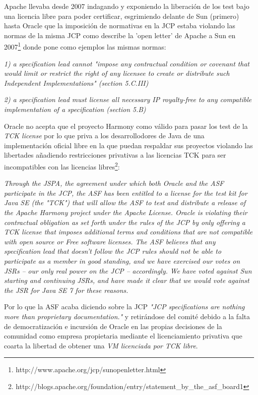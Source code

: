\documentclass[11pt]{scrartcl}
\begin{document}
Apache llevaba desde 2007 indagando y exponiendo la liberación de los test bajo una licencia libre para poder certificar, esgrimiendo delante de Sun (primero) hasta Oracle que la imposición de normativas en la JCP estaba violando las normas de la misma JCP como describe la 'open letter' de Apache a Sun en 2007\footnote{http://www.apache.org/jcp/sunopenletter.html} donde pone como ejemplos las mismas normas:

  \emph{1) a specification lead cannot "impose any contractual condition
     or covenant that would limit or restrict the right of any
     licensee to create or distribute such Independent
     Implementations" (section 5.C.III)}

  \emph{2) a specification lead must license all necessary IP
     royalty-free to any compatible implementation of a
     specification (section 5.B)}

Oracle no acepta que el proyecto Harmony como válido para pasar los test de la \emph{TCK license} por lo que priva a los desarrollodores de Java de una implementación oficial libre en la que puedan respaldar sus proyectos violando las libertades añadiendo restricciones privativas a las licencias TCK para ser incompatibles con las licencias libres\footnote{http://blogs.apache.org/foundation/entry/statement\_by\_the\_asf\_board1}:

    \emph{Through the JSPA, the agreement under which both Oracle and the ASF participate in the JCP, the ASF has been entitled to a license for the test kit for Java SE (the "TCK") that will allow the ASF to test and distribute a release of the Apache Harmony project under the Apache License. Oracle is violating their contractual obligation as set forth under the rules of the JCP by only offering a TCK license that imposes additional terms and conditions that are not compatible with open source or Free software licenses. The ASF believes that any specification lead that doesn't follow the JCP rules should not be able to participate as a member in good standing, and we have exercised our votes on JSRs -- our only real power on the JCP -- accordingly.  We have voted against Sun starting and continuing JSRs, and have made it clear that we would vote against the JSR for Java SE 7 for these reasons.}

Por lo que la ASF acaba diciendo sobre la JCP \emph{"JCP specifications are nothing more than proprietary documentation."} y retirándose del comité debido a la falta de democratización e incursión de Oracle en las propias decisiones de la comunidad como empresa propietaria mediante el licenciamiento privativa que coarta la libertad de obtener una \emph{VM licenciada por TCK libre}.
\end{document}
